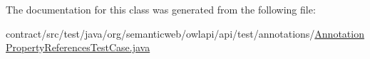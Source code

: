The documentation for this class was generated from the following file\-:\begin{DoxyCompactItemize}
\item 
contract/src/test/java/org/semanticweb/owlapi/api/test/annotations/\hyperlink{_annotation_property_references_test_case_8java}{Annotation\-Property\-References\-Test\-Case.\-java}\end{DoxyCompactItemize}
